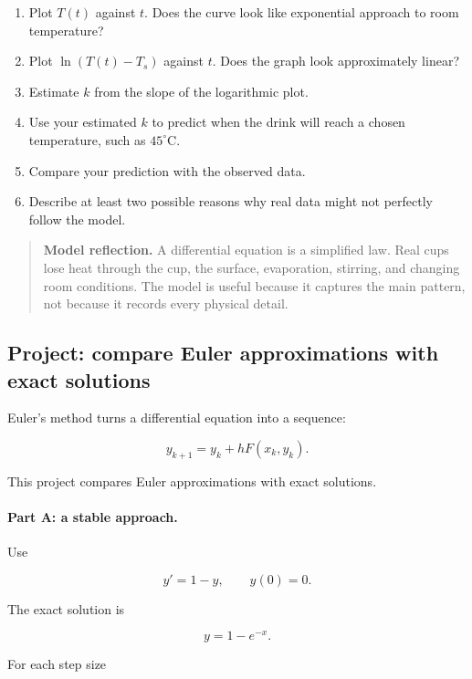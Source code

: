 \begin{enumerate}
\item Plot \(T(t)\) against \(t\).  Does the curve look like exponential approach to room
temperature?

\item Plot \(\ln(T(t)-T_s)\) against \(t\).  Does the graph look approximately linear?

\item Estimate \(k\) from the slope of the logarithmic plot.

\item Use your estimated \(k\) to predict when the drink will reach a chosen temperature,
such as \(45^\circ\text{C}\).

\item Compare your prediction with the observed data.

\item Describe at least two possible reasons why real data might not perfectly follow the
model.
\end{enumerate}

\begin{quote}
\textbf{Model reflection.}
A differential equation is a simplified law.  Real cups lose heat through the cup, the
surface, evaporation, stirring, and changing room conditions.  The model is useful
because it captures the main pattern, not because it records every physical detail.
\end{quote}

\subsection{Project: compare Euler approximations with exact solutions}
\label{subsec:project-euler-compare-exact}

Euler's method turns a differential equation into a sequence:

\[
y_{k+1}=y_k+hF(x_k,y_k).
\]

This project compares Euler approximations with exact solutions.

\paragraph{Part A: a stable approach.}
Use

\[
y'=1-y,
\qquad
y(0)=0.
\]

The exact solution is

\[
y=1-e^{-x}.
\]

For each step size


